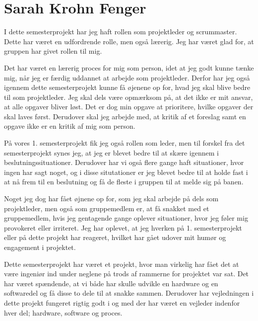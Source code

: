\section{Sarah Krohn Fenger}
I dette semesterprojekt har jeg haft rollen som projektleder og scrummaster. Dette har været en udfordrende rolle, men også lærerig. Jeg har været glad for, at gruppen har givet rollen til mig. 

Det har været en lærerig proces for mig som person, idet at jeg godt kunne tænke mig, når jeg er færdig uddannet at arbejde som projektleder. Derfor har jeg også igennem dette semesterprojekt kunne få øjenene op for, hvad jeg skal blive bedre til som projektleder. Jeg skal dels være opmærksom på, at det ikke er mit ansvar, at alle opgaver bliver løst. Det er dog min opgave at prioritere, hvilke opgaver der skal laves først. Derudover skal jeg arbejde med, at kritik af et foreslag samt en opgave ikke er en kritik af mig som person. 

På vores 1. semesterprojekt fik jeg også rollen som leder, men til forskel fra det semesterprojekt synes jeg, at jeg er blevet bedre til at skære igennem i beslutningssituationer. Derudover har vi også flere gange haft situationer, hvor ingen har sagt noget, og i disse situtationer er jeg blevet bedre til at holde fast i at nå frem til en beslutning og få de fleste i gruppen til at melde sig på banen. 

Noget jeg dog har fået øjnene op for, som jeg skal arbejde på dels som projektleder, men også som gruppemedlem er, at få snakket med et gruppemedlem, hvis jeg gentagende gange oplever situationer, hvor jeg føler mig provokeret eller irriteret. Jeg har oplevet, at jeg hverken på 1. semesterprojekt eller på dette projekt har reageret, hvilket har gået udover mit humør og engagement i projektet.


Dette semesterprojekt har været et projekt, hvor man virkelig har fået det at være ingeniør ind under neglene på trods af rammerne for projektet var sat. Det har været spændende, at vi både har skulle udvikle en hardware og en softwaredel og få disse to dele til at snakke sammen. Derudover har vejledningen i dette projekt fungeret rigtig godt i og med der har været en vejleder indenfor hver del; hardware, software og proces. 

\clearpage